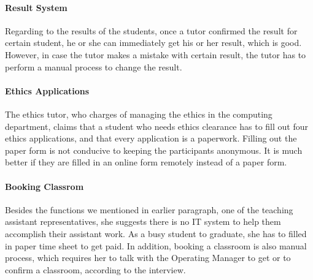 \paragraph{Result System}
Regarding to the results of the students, once a tutor confirmed the result for certain student, he or she can immediately get his or her result, which is good. However, in case the tutor makes a mistake with certain result, the tutor has to perform a manual process to change the result. 

\paragraph{Ethics Applications}
The ethics tutor, who charges of managing the ethics in the computing department, claims that a student who needs ethics clearance has to fill out four ethics applications, and that every application is a paperwork. Filling out the paper form is not conducive to keeping the participants anonymous. It is much better if they are filled in an online form remotely instead of a paper form.

\paragraph{Booking Classrom}
Besides the functions we mentioned in earlier paragraph, one of the teaching assistant representatives, she suggests there is no IT system to help them accomplish their assistant work. As a busy student to graduate, she has to filled in paper time sheet to get paid. In addition, booking a classroom is also manual process, which requires her to talk with the Operating Manager to get or to confirm a classroom, according to the interview.



